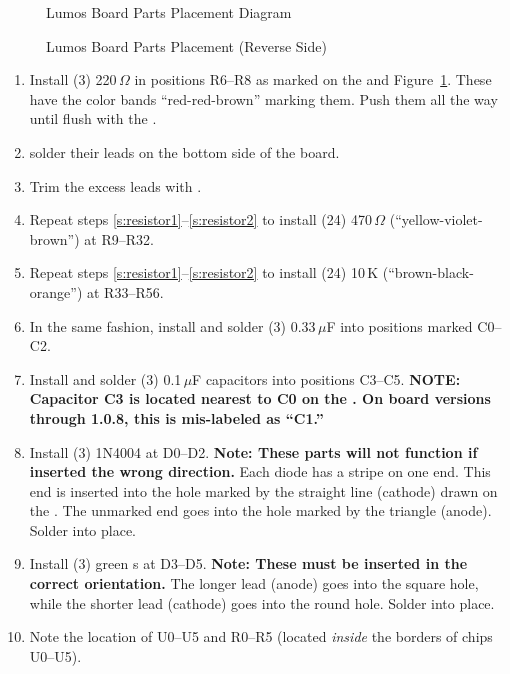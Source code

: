 \documentclass[letterpaper,twoside,onecolumn,openright,final]{memoir}
\begin{document}
\begin{figure}
\centerline{}
\caption{Lumos Board Parts Placement Diagram\label{fig:placement}}
\end{figure}
\begin{figure}
\centerline{}
\caption{Lumos Board Parts Placement (Reverse Side)\label{fig:placement-back}}
\end{figure}

\begin{enumerate}

\item\label{s:resistor1}
	Install (3) 220\,$\Omega$  in positions R6--R8 as marked on the 
	and Figure~\ref{fig:placement}.  These have the color bands ``red-red-brown'' 
	marking them.  Push them all the way until flush with the .
\item	solder their leads on the bottom side of the board.  
\item\label{s:resistor2}
	Trim the excess leads with .
\item	Repeat steps \ref{s:resistor1}--\ref{s:resistor2} to 
	install (24) 470\,$\Omega$  (``yellow-violet-brown'') at R9--R32.
\item	Repeat steps \ref{s:resistor1}--\ref{s:resistor2}
	to install (24) 10\,K  (``brown-black-orange'') at R33--R56.
\item	In the same fashion, install and solder (3) 0.33\,$\mu$F  into positions marked C0--C2.
\item	Install and solder (3) 0.1\,$\mu$F capacitors into positions C3--C5.
	{\bfseries NOTE: Capacitor C3 is located nearest to C0 on the . On
	board versions through 1.0.8, this is mis-labeled as ``C1.''}
\item	Install (3) 1N4004  at D0--D2.  {\bfseries Note: These parts will not function
	if inserted the wrong direction.} Each diode has
	a stripe on one end. This end is inserted into the hole marked by the straight line (cathode)
	drawn on the .  The unmarked end goes into the hole marked by the triangle
	(anode).  Solder into place. 
\item	Install (3) green s at D3--D5.  {\bfseries Note: These must be inserted in the 
	correct orientation.} The longer lead (anode) goes into the square hole, while the shorter
	lead (cathode) goes into the round hole.  Solder into place.
\item	Note the location of U0--U5 and R0--R5 (located \emph{inside} the borders of chips U0--U5).

\end{enumerate}
\end{document}

